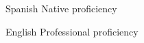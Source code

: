 
\begin{cvskills}

  \cvskill
    {Spanish} %
    {Native proficiency} %

  \cvskill
    {English} %
    {Professional proficiency} %
    
\end{cvskills}

